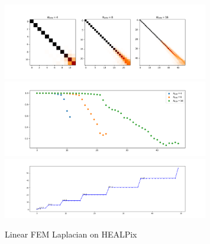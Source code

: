 \begin{figure}[h]
	\label{fig:FEMHealpix}
	\caption{Linear FEM Laplacian on HEALPix}
	\centering
	\includegraphics[width=0.8\textwidth]{../codes/03.FEM_laplacian/HEALPix/img/linearFEM.png}
	\includegraphics[width=0.8\textwidth]{../codes/03.FEM_laplacian/HEALPix/img/linearFEM_diagonal.png}	
	\includegraphics[width=0.8\textwidth]{../codes/03.FEM_laplacian/HEALPix/img/FEM_eigenvalues_16.png}	
\end{figure}

